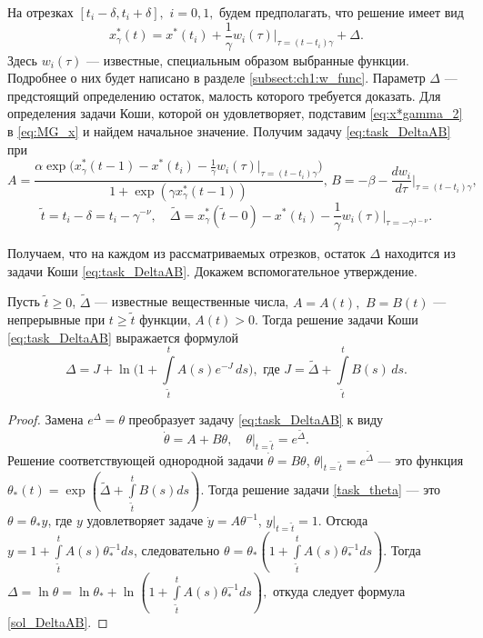 На отрезках $[t_i - \delta, t_i + \delta],$ $i=0, 1,$ будем предполагать, что решение имеет вид
%
\begin{equation}
    \label{eq:x*gamma_2}
    x^*_\gamma(t) = x^*(t_i) + \frac{1}{\gamma}w_i(\tau)|_{\tau=(t-t_i)\gamma} + \Delta.
\end{equation}
%
Здесь $w_i(\tau)$ --- известные, специальным образом выбранные функции. Подробнее о них будет написано в разделе \ref{subsect:ch1:w_func}. Параметр $\Delta$ --- предстоящий определению остаток, малость которого требуется доказать. Для определения задачи Коши, которой он удовлетворяет, подставим \eqref{eq:x*gamma_2} в \eqref{eq:MG_x} и найдем начальное значение. Получим задачу \eqref{eq:task_DeltaAB} при
\begin{equation}
    \label{AB_eq:x*gamma_2}
    A=\frac{\alpha\exp\big(x_{\gamma}^*(t-1)-x^*(t_i)-\frac{1}{\gamma}w_i(\tau)|_{\tau=(t-t_i)\gamma}\big)}{1+\exp(\gamma x_{\gamma}^*(t-1))},
    \,
    B=-\beta-\frac{dw_i}{d\tau}\Big|_{\tau=(t - t_i)\gamma},
\end{equation}
%
\begin{equation}\label{tilde_eq:x*gamma_2}
    \tilde{t} = t_i - \delta = t_i - \gamma^{-\nu},\quad \tilde{\Delta}=x_{\gamma}^*(\tilde{t} - 0) - x^*(t_i) -\frac{1}{\gamma} w_i(\tau)|_{\tau = -\gamma^{1 - \nu}}.
\end{equation}

Получаем, что на каждом из рассматриваемых отрезков, остаток $\Delta$ находится из задачи Коши \eqref{eq:task_DeltaAB}. Докажем вспомогательное утверждение.

\begin{lemma}\label{lm:DeltaAB}
Пусть $\tilde{t} \geqslant 0$, $\tilde{\Delta}$ --- известные вещественные числа, $A = A(t),$ $B = B(t)$ --- непрерывные при $t \geq \tilde{t}$ функции, $A(t) > 0$. Тогда решение задачи Коши \eqref{eq:task_DeltaAB} выражается формулой
	\begin{equation}\label{sol_DeltaAB}
	\Delta = J + \ln\Big(1 + \int\limits_{\tilde{t}}^{t} A(s) e^{-J}\,ds \Big),
	\text{ где } J = \tilde{\Delta} + \int\limits_{\tilde{t}}^{t} B(s)\,ds.
	\end{equation}
\end{lemma}
\begin{proof}
    Замена $e^{\Delta}=\theta$ преобразует задачу \eqref{eq:task_DeltaAB} к виду
    \begin{equation}\label{task_theta}
		\dot{\theta}=A+B\theta,\quad\theta|_{t=\tilde{t}}=e^{\tilde{\Delta}}.
    \end{equation}
    Решение соответствующей однородной задачи $\dot{\theta}=B\theta$, $\theta|_{t=\tilde{t}}=e^{\tilde{\Delta}}$ --- это функция $\theta_*(t)=\exp(\tilde{\Delta}+\int\limits_{\tilde{t}}^{t}B(s)ds).$ Тогда решение задачи \eqref{task_theta} --- это $\theta=\theta_* y$, где $y$ удовлетворяет задаче $\dot{y} = A \theta^{-1}$, $y|_{t=\tilde{t}} = 1$. Отсюда $y = 1 + \int\limits_{\tilde{t}}^{t}A(s)\theta_*^{-1}ds$, следовательно $\theta=\theta_*(1+\int\limits_{\tilde{t}}^{t}A(s)\theta_*^{-1}ds)$.
    Тогда $\Delta=\ln\theta=\ln\theta_*+\ln(1+\int\limits_{\tilde{t}}^{t}A(s)\theta_*^{-1}ds),$ откуда следует формула \eqref{sol_DeltaAB}.
\end{proof}

